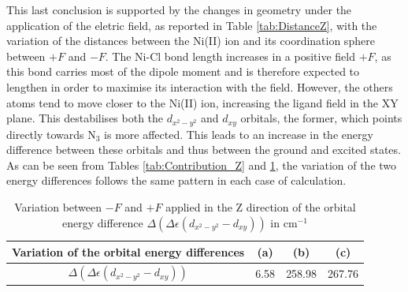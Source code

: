 \documentclass[12pt]{report}
\numberwithin{equation}{section}
\begin{document}
This last conclusion is supported by the changes in geometry under the application of the eletric field, as reported in Table \ref{tab:DistanceZ}, with the variation of the distances between the Ni(II) ion and its coordination sphere between $+F$ and $-F$.
The Ni-Cl bond length increases in a positive field $+F$, as this bond carries most of the dipole moment and is therefore expected to lengthen in order to maximise its interaction with the field. 
However, the others atoms tend to move closer to the Ni(II) ion, increasing the ligand field in the XY plane. 
This destabilises both the $d_{x^2-y^2}$ and $d_{xy}$ orbitals, the former, which points directly towards N$_3$ is more affected.
This leads to an increase in the energy difference between these orbitals and thus between the ground and excited states.
As can be seen from Tables \ref{tab:Contribution_Z} and \ref{tab:EOrbitaleZ}, the variation of the two energy differences follows the same pattern in each case of calculation.

\begin{table}[h]
    \centering
    \begin{tabular}{|c | c c c |}
        \hline
        Variation of the orbital energy differences & (a) & (b) & (c)\\
        \hline
        $\Delta(\Delta \epsilon (d_{x^2-y^2}-d_{xy}))$& 6.58 & 258.98 & 267.76\\
        \hline
    \end{tabular}
    \caption{Variation between $-F$ and $+F$ applied in the Z direction of the orbital energy difference $\Delta(\Delta \epsilon (d_{x^2-y^2}-d_{xy}))$ in cm$^{-1}$}
    \label{tab:EOrbitaleZ}
\end{table}
\end{document}
